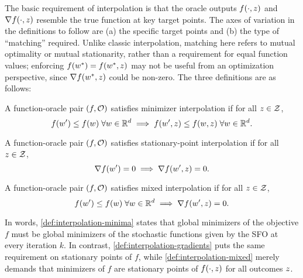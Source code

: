 The basic requirement of interpolation is that the oracle outputs \( f(\cdot, \z) \) and \( \grad(\cdot, \z) \) resemble the true function at key target points.  
The axes of variation in the definitions to follow are (a) the specific target points and (b) the type of ``matching'' required.
Unlike classic interpolation, matching here refers to mutual optimality or mutual stationarity, rather than a requirement for equal function values; 
enforcing \( f(\wopt) = f(\wopt, \z) \) may not be useful from an optimization perspective, since \( \grad(\wopt, \z) \) could be non-zero.
The three definitions are as follows:

\begin{definition}\label{def:interpolation-minima}
    A function-oracle pair \( (f, \oracle{}) \) satisfies minimizer interpolation if for all \( \z \in \calZ \),
    \[ f(\w') \leq f(\w) \; \forall \w \in \R^d \implies f(\w', \z) \leq f(\w, \z) \; \forall \w \in \R^d.  \]
\end{definition}
\begin{definition}\label{def:interpolation-gradients}
    A function-oracle pair \( (f, \oracle{}) \) satisfies stationary-point interpolation if for all \( \z \in \calZ \),
    \[ \grad(\w') = 0 \implies \grad(\w', \z) = 0. \]
\end{definition}
\begin{definition}\label{def:interpolation-mixed}
    A function-oracle pair \( (f, \oracle{}) \) satisfies mixed interpolation if for all \( \z \in \calZ \),
    \[ f(\w') \leq f(\w) \; \forall \w \in \R^d \implies \grad(\w', \z) = 0. \]
\end{definition}
In words, \autoref{def:interpolation-minima} states that global minimizers of the objective \( f \) must be global minimizers of the stochastic functions given by the \ac{SFO} at every iteration \( k \).
In contrast, \autoref{def:interpolation-gradients} puts the same requirement on stationary points of \( f \), while \autoref{def:interpolation-mixed} merely demands that minimizers of \( f \) are stationary points of \( f(\cdot, \z) \) for all outcomes \( \z \).

